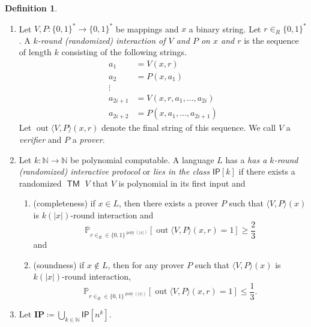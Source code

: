\documentclass[10pt,letterpaper,cm]{nupset}
\theoremstyle{definition}
\newtheorem*{definition}{Definition}
\newcommand{\N}{\mathbb N}
\newcommand{\1}{\mathbf{1}}
\newcommand{\0}{\vec 0}
\DeclareMathOperator{\out}{out}
\DeclareMathOperator{\TM}{\mathsf{TM}}
\DeclareMathOperator{\poly}{poly}
\begin{document}
\begin{definition} $ $
\begin{enumerate}
\item  Let $V, P: \{0,1\}^{\ast} \to \{0,1\}^{\ast}$ be mappings and $x$ a binary string. Let $r\in_R \{0,1\}^{\ast}$. A \textit{$k$-round (randomized) interaction of $V$ and $P$ on $x$ and $r$} is the sequence of length $k$  consisting of the following strings.
\[
\begin{aligned} a_{1} &=V(x, r) \\ a_{2} &=P\left(x, a_{1}\right) \\ \vdots & \\ a_{2 i+1} &=V\left(x,r, a_{1}, \ldots, a_{2 i}\right) \\ a_{2 i+2} &=P\left(x, a_{1}, \ldots, a_{2 i+1}\right) \end{aligned}
\] Let $\out{\langle V, P\rangle (x, r)}$ denote the final string of this sequence. We call $V$ a \textit{verifier} and $P$ a \textit{prover}.
\item Let $k : \N \to \N$ be polynomial computable. A language $L$ has a \textit{has a $k$-round (randomized) interactive protocol} or \textit{lies in the class $\mathsf{IP}[k]$} if there exists a randomized $\TM$ $V$ that $V$ is polynomial in its first input and
\begin{enumerate}
\item (completeness) if $x\in L$, then there exists a prover $P$ such that $\langle V, P\rangle(x)$ is $k(|x|)$-round interaction and $$\mathbb{P}_{r\in_R \in \{0,1\}^{\poly(\lvert{x}\rvert)}}[\out{\langle V, P\rangle(x, r)} =1] \geq \frac{2}{3}$$ and 
\item (soundness) if $x\notin L$, then for any prover $P$ such that $\langle V, P\rangle(x)$ is $k(|x|)$-round interaction, $$\mathbb{P}_{r\in_R \in \{0,1\}^{\poly(\lvert{x}\rvert)}}[\out{\langle V, P\rangle(x, r)} =1] \leq \frac{1}{3}.$$
\end{enumerate}
\item Let $\mathbf{IP} \coloneqq \bigcup_{k\in \N}\mathsf{IP}[n^k]$.
\end{enumerate}
\end{definition}
\end{document}
